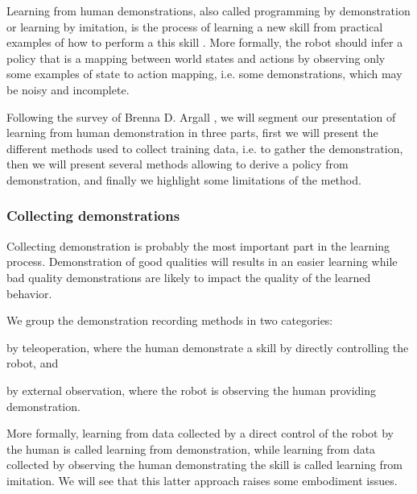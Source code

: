 Learning from human demonstrations, also called programming by demonstration or learning by imitation, is the process of learning a new skill from practical examples of how to perform a this skill \cite{schaal1999imitation,calinon2008robot,argall09survey,lopes10imitationchapter}. More formally, the robot should infer a policy that is a mapping between world states and actions by observing only some examples of state to action mapping, i.e. some demonstrations, which may be noisy and incomplete.

Following the survey of Brenna D. Argall \cite{argall09survey}, we will segment our presentation of learning from human demonstration in three parts, first we will present the different methods used to collect training data, i.e. to gather the demonstration, then we will present several methods allowing to derive a policy from demonstration, and finally we highlight some limitations of the method.


\subsubsection*{Collecting demonstrations}

Collecting demonstration is probably the most important part in the learning process. Demonstration of good qualities will results in an easier learning while bad quality demonstrations are likely to impact the quality of the learned behavior.

We group the demonstration recording methods in two categories: \begin{inparaenum} \item by teleoperation, where the human demonstrate a skill by directly controlling the robot, and \item by external observation, where the robot is observing the human providing demonstration. \end{inparaenum} More formally, learning from data collected by a direct control of the robot by the human is called learning from demonstration, while learning from data collected by observing the human demonstrating the skill is called learning from imitation. We will see that this latter approach raises some embodiment issues.

